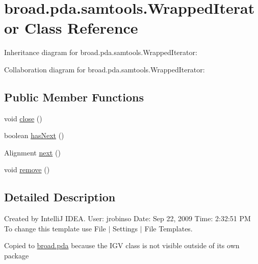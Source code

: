 \hypertarget{classbroad_1_1pda_1_1samtools_1_1_wrapped_iterator}{\section{broad.\+pda.\+samtools.\+Wrapped\+Iterator Class Reference}
\label{classbroad_1_1pda_1_1samtools_1_1_wrapped_iterator}
}


Inheritance diagram for broad.\+pda.\+samtools.\+Wrapped\+Iterator\+:


Collaboration diagram for broad.\+pda.\+samtools.\+Wrapped\+Iterator\+:
\subsection*{Public Member Functions}
\begin{DoxyCompactItemize}
\item 
void \hyperlink{classbroad_1_1pda_1_1samtools_1_1_wrapped_iterator_aaa2c9f20f6e76125330e240265c57aa2}{close} ()
\item 
boolean \hyperlink{classbroad_1_1pda_1_1samtools_1_1_wrapped_iterator_a89f1437aa6ace11f8279894e50c870fc}{has\+Next} ()
\item 
Alignment \hyperlink{classbroad_1_1pda_1_1samtools_1_1_wrapped_iterator_ad892432d19f9e02441b6ea2a8da52842}{next} ()
\item 
void \hyperlink{classbroad_1_1pda_1_1samtools_1_1_wrapped_iterator_a8ddaa0fd51b4781835b2729b710d6dab}{remove} ()
\end{DoxyCompactItemize}


\subsection{Detailed Description}
Created by Intelli\+J I\+D\+E\+A. User\+: jrobinso Date\+: Sep 22, 2009 Time\+: 2\+:32\+:51 P\+M To change this template use File $\vert$ Settings $\vert$ File Templates.

Copied to \hyperlink{namespacebroad_1_1pda}{broad.\+pda} because the I\+G\+V class is not visible outside of its own package 

